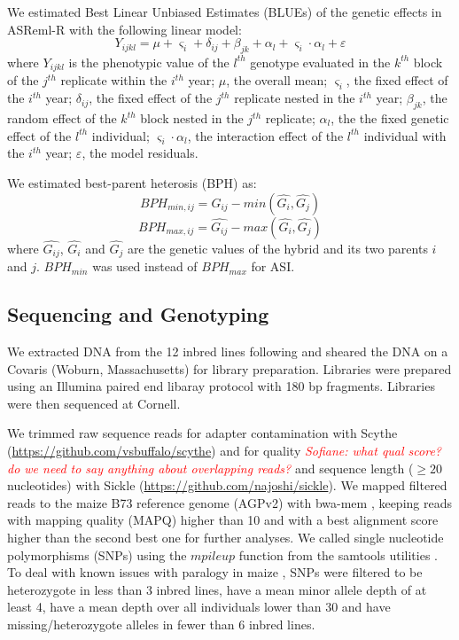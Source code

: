 \documentclass[9pt,twocolumn,twoside]{gsajnl}
\newcommand{\jri}[1]{\textcolor{red}{ \emph{ #1}} }
\begin{document}
We estimated Best Linear Unbiased Estimates (BLUEs) of the genetic effects in ASReml-R \citep{gilmour2009asreml} with the following linear model: 
%
\[Y_{ijkl} = \mu + \varsigma_{i} + \delta_{ij} + \beta_{jk} + \alpha_{l} +  \varsigma_{i} \cdot \alpha_{l} + \varepsilon\]
%
where 
$Y_{ijkl}$ is the phenotypic value of the $l^{th}$ genotype evaluated in the $k^{th}$ block of the $j^{th}$ replicate within the $i^{th}$ year; 
$\mu$, the overall mean; 
$\varsigma_{i}$, the fixed effect of the $i^{th}$ year;
$\delta_{ij}$, the fixed effect of the $j^{th}$ replicate nested in the $i^{th}$ year; 
$\beta_{jk}$, the random effect of the $k^{th}$ block nested in the $j^{th}$ replicate; 
$\alpha_{l}$, the the fixed genetic effect  of the $l^{th}$ individual; 
$\varsigma_{i} \cdot \alpha_{l}$, the interaction effect of the $l^{th}$ individual with the $i^{th}$ year; 
$\varepsilon$, the model residuals. 

We estimated best-parent heterosis (BPH) as:
%
\[ BPH_{min,ij}=\hat{G_{ij}}-min(\hat{G_{i}} ,\hat{G_{j}}) \] 
\[ BPH_{max,ij}=\hat{G_{ij}}-max(\hat{G_{i}} ,\hat{G_{j}}) \]
%
where $\hat{G_{ij}}$, $\hat{G_{i}}$ and $\hat{G_{j}}$ are the genetic values of the hybrid and its two parents $i$ and $j$. $BPH_{min}$ was used instead of $BPH_{max}$ for ASI. 

\subsection*{Sequencing and Genotyping}

We extracted DNA from the 12 inbred lines following \citet{Doyle1987} and sheared the DNA on a Covaris (Woburn, Massachusetts) for library preparation. Libraries were prepared using an Illumina paired end libaray protocol with 180 bp fragments. Libraries were then sequenced at Cornell.

We trimmed raw sequence reads for adapter contamination with Scythe  (\url{https://github.com/vsbuffalo/scythe}) and for quality \jri{Sofiane: what qual score? do we need to say anything about overlapping reads?} and sequence length ($\geq 20$ nucleotides) with Sickle (\url{https://github.com/najoshi/sickle}). 
We mapped filtered reads to the maize B73 reference genome (AGPv2) with bwa-mem \citep{Li2009B}, keeping reads with mapping quality (MAPQ) higher than 10 and with a best alignment score higher than the second best one for further analyses.
We called single nucleotide polymorphisms (SNPs) using the $mpileup$ function from the samtools utilities \citep{Li2009}. 
To deal with known issues with paralogy in maize \citep{Chia2012}, SNPs were filtered to be heterozygote in less than 3 inbred lines, have a mean minor allele depth of at least 4, have a mean depth over all individuals lower than 30 and have missing/heterozygote alleles in fewer than 6 inbred lines. 
\end{document}

